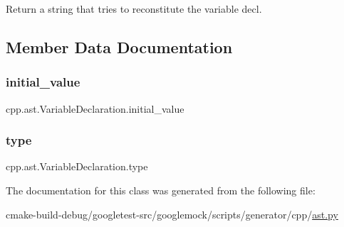 \begin{DoxyVerb}Return a string that tries to reconstitute the variable decl.\end{DoxyVerb}
 

\subsection{Member Data Documentation}
\mbox{\label{classcpp_1_1ast_1_1VariableDeclaration_a7c259ca42a06e264679e8ab66e7ea374}} 
\subsubsection{\texorpdfstring{initial\_value}{initial\_value}}
{\footnotesize\ttfamily cpp.\+ast.\+Variable\+Declaration.\+initial\+\_\+value}

\mbox{\label{classcpp_1_1ast_1_1VariableDeclaration_a8c7cc8578ea12f93c6e1c5c6ef4ddf99}} 
\subsubsection{\texorpdfstring{type}{type}}
{\footnotesize\ttfamily cpp.\+ast.\+Variable\+Declaration.\+type}



The documentation for this class was generated from the following file\+:\begin{DoxyCompactItemize}
\item 
cmake-\/build-\/debug/googletest-\/src/googlemock/scripts/generator/cpp/\mbox{\hyperlink{ast_8py}{ast.\+py}}\end{DoxyCompactItemize}
